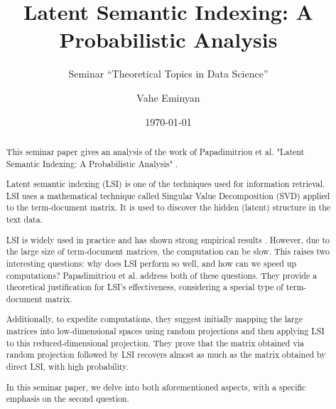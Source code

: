 \documentclass[a4paper,11pt,DIV=15]{scrartcl} %
\theoremstyle{plain}
\theoremstyle{definition}
\begin{document}
\subtitle{Seminar ``Theoretical Topics in Data Science''}
\date{\today}
\publishers{RWTH Aachen University}	%

\title{Latent Semantic Indexing: A Probabilistic Analysis}

\author{Vahe Eminyan}

\maketitle


\begin{abstract}
This seminar paper gives an analysis of the work of  Papadimitriou et al. "Latent Semantic Indexing: A Probabilistic Analysis" \cite{APAPADIMITRIOU2000217}.

Latent semantic indexing (LSI) is one of the techniques used for information retrieval.
LSI uses a mathematical technique called Singular Value Decomposition (SVD) applied to the term-document matrix. It is used to discover the hidden (latent) structure in the text data.

LSI is widely used in practice and has shown strong empirical results \cite{LSIusage1, LSIusage2, LSIusage3}. However, due to the large size of term-document matrices, the computation can be slow. This raises two interesting questions: why does LSI perform so well, and how can we speed up computations?
Papadimitriou et al. address both of these questions.
They provide a theoretical justification for LSI's effectiveness, considering a special type of term-document matrix.

Additionally, to expedite computations, they suggest initially mapping the large matrices into low-dimensional spaces using random projections and then applying LSI to this reduced-dimensional projection.
They prove that the matrix obtained via random projection followed by LSI recovers almost as
much as the matrix obtained by direct LSI, with high probability.

In this seminar paper, we delve into both aforementioned aspects, with a specific emphasis on the second question. 





\end{abstract}

\thispagestyle{empty}
\end{document}
